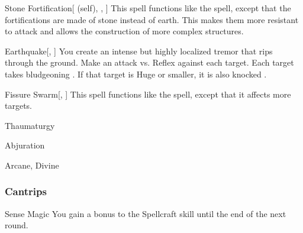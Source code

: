 \lowercase{\hypertarget{spell:Stone Fortification}{}}\label{spell:Stone Fortification}
\begin{attuneability}[\nth{4}]{\hypertarget{spell:Stone Fortification}{Stone Fortification}}[ (self), , ]
This spell functions like the  spell, except that the fortifications are made of stone instead of earth.
This makes them more resistant to attack and allows the construction of more complex structures.
\end{attuneability}
\vspace{0.25em}



\lowercase{\hypertarget{spell:Earthquake}{}}\label{spell:Earthquake}
\begin{freeability}[\nth{6}]{\hypertarget{spell:Earthquake}{Earthquake}}[, ]
You create an intense but highly localized tremor that rips through the ground.
Make an attack vs. Reflex against each target.
\hit Each target takes bludgeoning .
If that target is Huge or smaller, it is also knocked .
\end{freeability}
\vspace{0.25em}



\lowercase{\hypertarget{spell:Fissure Swarm}{}}\label{spell:Fissure Swarm}
\begin{freeability}[\nth{7}]{\hypertarget{spell:Fissure Swarm}{Fissure Swarm}}[, ]
This spell functions like the  spell, except that it affects more targets.
\end{freeability}
\vspace{0.25em}


\newpage
\begin{spellsection}{Thaumaturgy}

\begin{spellheader}
\end{spellheader}


 Abjuration

 Arcane, Divine

\subsubsection{Cantrips}


\begin{freeability}{Sense Magic}
You gain a  bonus to the Spellcraft skill until the end of the next round.
\end{freeability}

\end{spellsection}


